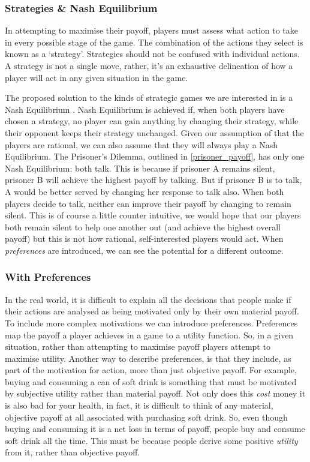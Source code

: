 \documentclass[11pt]{article}
\newcommand*{\np}{\par\noindent\newline}
\begin{document}
\subsubsection{Strategies \& Nash Equilibrium}
In attempting to maximise their payoff, players must assess what action to take
in every possible stage of the game. The combination of the actions they select
is known as a `strategy'. Strategies should not be confused with individual
actions. A strategy is not a single move, rather, it's an exhaustive
delineation of how a player will act in any given situation in the game. 

\np The proposed solution to the kinds of strategic games we are interested in
is a Nash Equilibrium \cite{angner_course_2012}. Nash Equilibrium is achieved
if, when both players have chosen a strategy, no player can gain anything by
changing their strategy, while their opponent keeps their strategy unchanged.
Given our assumption of that the players are rational, we can also assume that
they will always play a Nash Equilibrium. The Prisoner's Dilemma, outlined in
\ref{prisoner_payoff}, has only one Nash Equilibrium: both talk. This is
because if prisoner A remains silent, prisoner B will achieve the highest
payoff by talking. But if prisoner B is to talk, A would be better served by
changing her response to talk also. When both players decide to talk, neither
can improve their payoff by changing to remain silent. This is of course a
little counter intuitive, we would hope that our players both remain silent to
help one another out (and achieve the highest overall payoff) but this is not
how rational, self-interested players would act. When \textit{preferences} are
introduced, we can see the potential for a different outcome.

\subsubsection{With Preferences}
In the real world, it is difficult to explain all the decisions that people
make if their actions are analysed as being motivated only by their own
material payoff. To include more complex motivations we can introduce
preferences. Preferences map the payoff a player achieves in a game to a
utility function. So, in a given situation, rather than attempting to maximise
payoff players attempt to maximise utility. Another way to describe
preferences, is that they include, as part of the motivation for action, more
than just objective payoff. For example, buying and consuming a can of soft
drink is something that must be motivated by subjective utility rather than
material payoff. Not only does this \textit{cost} money it is also bad for your
health, in fact, it is difficult to think of any material, objective payoff at
all associated with purchasing soft drink. So, even though buying and consuming
it is a net loss in terms of payoff, people buy and consume soft drink all the
time. This must be because people derive some positive \textit{utility} from
it, rather than objective payoff.
\end{document}
